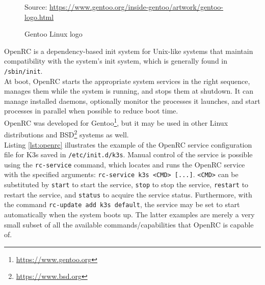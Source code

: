 \begin{figure} %
  \centering
  \def\stackalignment{r} %
  {\scriptsize \parbox[t]{\linewidth}{ Source: \url{https://www.gentoo.org/inside-gentoo/artwork/gentoo-logo.html}} }
  \caption{Gentoo Linux logo}
\end{figure}

OpenRC is a dependency-based init system for Unix-like systems that maintain
compatibility with the system's init system, which is generally found in \texttt{/sbin/init}.
\\ %
At boot, OpenRC starts the appropriate system services in the right sequence, manages
them while the system is running, and stops them at shutdown. It can manage installed
daemons, optionally monitor the processes it launches, and start processes in parallel
when possible to reduce boot time. \\ %
OpenRC was developed for Gentoo\footnote{\url{https://www.gentoo.org}}, but it
may be used in other Linux distributions and BSD\footnote{\url{https://www.bsd.org}}
systems as well\cite{openrc}. \\ %
Listing \ref{lst:openrc} illustrates the example of the OpenRC service configuration
file for K3s saved in \texttt{/etc/init.d/k3s}. Manual control of the service is
possible using the \texttt{rc-service} command, which locates and runs the
OpenRC service with the specified arguments: \texttt{rc-service k3s <CMD> [...]}.
\texttt{<CMD>} can be substituted by \texttt{start} to start the service,
\texttt{stop} to stop the service, \texttt{restart} to restart the service, and
\texttt{status} to acquire the service status. Furthermore, with the command \texttt{rc-update
add k3s default}, the service may be set to start automatically when the system boots
up. The latter examples are merely a very small subset of all the available
commands/capabilities that OpenRC is capable of.

